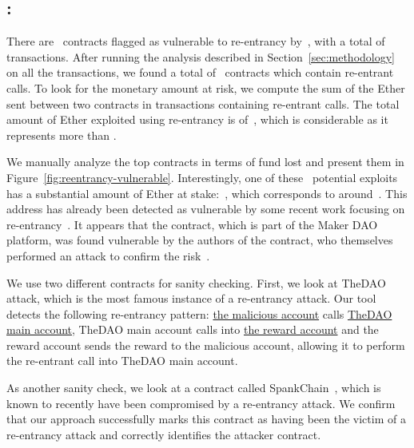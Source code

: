 \subsection{\vre: \reentrancy}
\label{ssec:analysis-re}
There are~ contracts flagged as vulnerable to re-entrancy by~\cite{Luu2016a,Tsankov2018,DBLP:conf/ndss/KalraGDS18}, with a total of~ transactions. After running the analysis described in Section~\ref{sec:methodology} on all the transactions, we found a total of~ contracts which contain re-entrant calls. To look for the monetary amount at risk, we compute the sum of the Ether sent between two contracts in transactions containing re-entrant calls. The total amount of Ether exploited using re-entrancy is of~, which is considerable as it represents more than .

We manually analyze the top contracts in terms of fund lost and present them in Figure~\ref{fig:reentrancy-vulnerable}. Interestingly, one of these~ potential exploits has a substantial amount of Ether at stake:~, which corresponds to around~. This address has already been detected as vulnerable by some recent work focusing on re-entrancy~\cite{Rodler2019}. It appears that the contract, which is part of the Maker DAO~\cite{maker-dao} platform, was found vulnerable by the authors of the contract, who themselves performed an attack to confirm the risk~\cite{ds-eth-token}.

We use two different contracts for sanity checking.
First, we look at TheDAO attack, which is the most famous instance of a re-entrancy attack. Our tool detects the following re-entrancy pattern: \href{https://etherscan.io/address/0xc0ee9db1a9e07ca63e4ff0d5fb6f86bf68d47b89}{the malicious account} calls \href{https://etherscan.io/address/0xbb9bc244d798123fde783fcc1c72d3bb8c189413}{TheDAO main account}, TheDAO main account calls into \href{https://etherscan.io/address/0xd2e16a20dd7b1ae54fb0312209784478d069c7b0}{the reward account} and the reward account sends the reward to the malicious account, allowing it to perform the re-entrant call into TheDAO main account.

As another sanity check, we look at a contract called SpankChain~\cite{spank-chain}, which is known to recently have been compromised by a re-entrancy attack. We confirm that our approach successfully marks this contract as having been the victim of a re-entrancy attack and correctly identifies the attacker contract.

